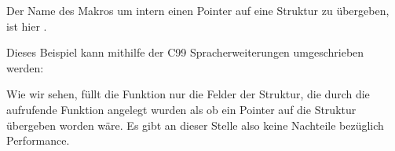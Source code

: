 

Der Name des Makros um intern einen Pointer auf eine Struktur zu übergeben, ist hier .

Dieses Beispiel kann mithilfe der C99 Spracherweiterungen umgeschrieben werden:




Wie wir sehen, füllt die Funktion nur die Felder der Struktur, die durch die aufrufende Funktion angelegt wurden als ob
ein Pointer auf die Struktur übergeben worden wäre. Es gibt an dieser Stelle also keine Nachteile bezüglich Performance.
